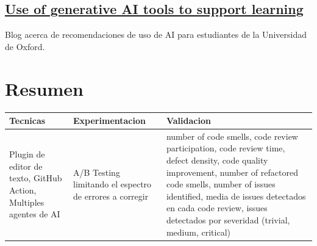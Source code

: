 \documentclass{article}
\begin{document}
\subsection{\href{https://www.ox.ac.uk/students/academic/guidance/skills/ai-study}{Use of generative AI tools to support learning}}

Blog acerca de recomendaciones de uso de AI para estudiantes de la Universidad de Oxford.

\section{Resumen}

\begin{center}
    \begin{table}
        \centering
        \begin{tabular}{|p{5cm}|p{3cm}|p{4cm}|}
        \hline
        Tecnicas & Experimentacion & Validacion \\ \hline
        Plugin de editor de texto, GitHub Action, Multiples agentes de AI &  A/B Testing limitando el espectro de errores a corregir               & number of code smells, code review participation, code review time, defect density, code quality improvement, number of refactored code smells, number of issues identified, media de issues detectados en cada code review, issues detectados por severidad (trivial, medium, critical)           \\ \hline
        \end{tabular}
    \end{table}
\end{center}



\end{document}
